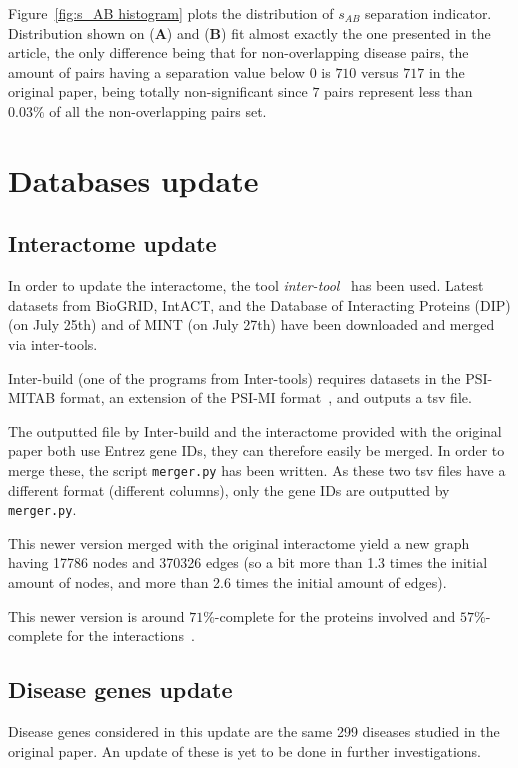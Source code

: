 \documentclass[letterpaper]{article}
\begin{document}
	Figure~\ref{fig:s_AB histogram} plots the distribution of $s_{AB}$ separation indicator.
	Distribution shown on ({\bf A}) and ({\bf B}) fit almost exactly the one presented in the article, the only difference
	being that for non-overlapping disease pairs, the amount of pairs having a separation value below 0 is $710$
	versus $717$ in the original paper, being totally non-significant since $7$ pairs represent less than
	$0.03\%$ of all the non-overlapping pairs set.


\section{Databases update}

	\subsection{Interactome update}
	In order to update the interactome, the tool \textit{inter-tool}~\citep{inter-tools} has been used.
	Latest datasets from BioGRID, IntACT, and the Database of Interacting Proteins (DIP)
	(on July 25th) and of MINT (on July 27th) have been downloaded and merged via inter-tools.

	Inter-build (one of the programs from Inter-tools) requires datasets in the PSI-MITAB format, an extension of the
	PSI-MI format~\citep{MITABFormat}, and outputs a tsv file.

	The outputted file by Inter-build and the interactome provided with the original paper both use Entrez gene IDs, they
	can therefore easily be merged. In order to merge these, the script \texttt{merger.py} has been written. As these two
	tsv files have a different format (different columns), only the gene IDs are outputted by \texttt{merger.py}.

	This newer version merged with the original interactome yield a new graph having 17786 nodes and 370326 edges
	(so a bit more than 1.3 times the initial amount of nodes, and more than 2.6 times the initial amount of edges).

	This newer version is around $71\%$-complete for the proteins involved and $57\%$-complete for the
	interactions~\citep{estimatingTheSizeOfTheHumanInteractome,ATruerMeasureOfOurIgnorance}.

	\subsection{Disease genes update}
	Disease genes considered in this update are the same 299 diseases studied in the original paper. An update of these
	is yet to be done in further investigations.
\end{document}

